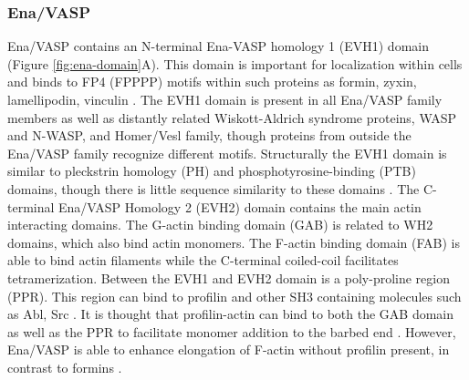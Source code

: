\subsubsection{Ena/VASP}
Ena/VASP contains an N-terminal Ena-VASP homology 1 (EVH1) domain (Figure \ref{fig:ena-domain}A). This domain is important for localization within cells and binds to FP4 (FPPPP) motifs within such proteins as formin, zyxin, lamellipodin, vinculin \citep{ball_dual_2000, niebuhr_novel_1997, klostermann_orthologous_2000}. The EVH1 domain is present in all Ena/VASP family members as well as distantly related Wiskott-Aldrich syndrome proteins, WASP and N-WASP, and Homer/Vesl family, though proteins from outside the Ena/VASP family recognize different motifs. Structurally the EVH1 domain is similar to pleckstrin homology (PH) and phosphotyrosine-binding (PTB) domains, though there is little sequence similarity to these domains \citep{prehoda_structure_1999,reinhard_actin-based_2001,ball_dual_2000,fedorov_structure_1999}.
The C-terminal Ena/VASP Homology 2 (EVH2) domain contains the main actin interacting domains. The G-actin binding domain (GAB) is related to WH2 domains, which also bind actin monomers. The F-actin binding domain (FAB) is able to bind actin filaments while the C-terminal coiled-coil facilitates tetramerization. Between the EVH1 and EVH2 domain is a poly-proline region (PPR). This region can bind to profilin and other SH3 containing molecules such as Abl, Src \citep{lanier_abl_2000, gertler_mena_1996}. It is thought that profilin-actin can bind to both the GAB domain as well as the PPR to facilitate monomer addition to the barbed end \citep{ferron_structural_2007}. However, Ena/VASP is able to enhance elongation of F-actin without profilin present, in contrast to formins \citep{hansen_vasp_2010,breitsprecher_molecular_2011,winkelman_ena/vasp_2014,bruhmann_distinct_2017}.

